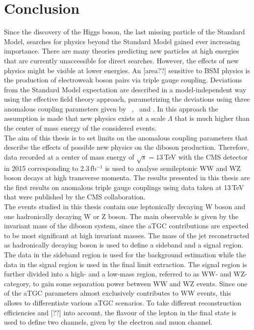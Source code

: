 \chapter{Conclusion}
\label{ch:Conclusion}
Since the discovery of the Higgs boson, the last missing particle of the Standard Model, searches for physics beyond the Standard Model gained ever increasing importance. There are many theories predicting new particles at high energies that are currently unaccessible for direct searches. However, the effects of new physics might be visible at lower energies. An [area??] sensitive to BSM physics is the production of electroweak boson pairs via triple gauge coupling. Deviations from the Standard Model expectation are described in a model-independent way using the effective field theory approach, parametrizing the deviations using three anomalous coupling parameters given by \Tcwww \ , \Tccw \ and \Tcb . In this approach the assumption is made that new physics exists at a scale $\Lambda$ that is much higher than the center of mass energy of the considered events.\\

The aim of this thesis is to set limits on the anomalous coupling parameters that describe the effects of possible new physics on the diboson production. Therefore, data recorded at a center of mass energy of $\sqrt{s}=13$\,TeV with the CMS detector in 2015 corresponding to 2.3\,fb$^{-1}$ is used to analyse semileptonic WW and WZ boson decays at high transverse momenta. The results presented in this thesis are the first results on anomalous triple gauge couplings using data taken at 13\,TeV that were published by the CMS collaboration.\\

The events studied in this thesis contain one leptonically decaying W boson and one hadronically decaying W or Z boson. The main observable is given by the invariant mass of the diboson system, since the aTGC contributions are expected to be most significant at high invariant masses. The mass of the jet reconstructed as hadronically decaying boson is used to define a sideband and a signal region. The data in the sideband region is used for the background estimation while the data in the signal region is used in the final limit extraction. The signal region is further divided into a high- and a low-mass region, referred to as WW- and WZ-category, to gain some separation power between WW and WZ events. Since one of the aTGC parameters almost exclusively contributes to WW events, this allows to differentiate various aTGC scenarios. To take different reconstruction efficiencies and [??] into account, the flavour of the lepton in the final state is used to define two channels, given by the electron and muon channel.\\

